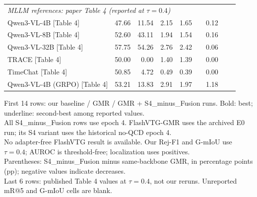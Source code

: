 \documentclass{article}
\begin{document}
\begin{table}[ht]
{\begin{tabular}{lrrrrrrrr}
\midrule
\multicolumn{9}{l}{\textit{MLLM references: paper Table 4 (reported at $\tau=0.4$)}} \\
Qwen3-VL-4B [Table 4] & 47.66 & 11.54 & 2.15 & 1.65 &  & 0.12 &  &  \\
Qwen3-VL-8B [Table 4] & 52.60 & 43.11 & 1.94 & 1.54 &  & 0.16 &  &  \\
Qwen3-VL-32B [Table 4] & 57.75 & 54.26 & 2.76 & 2.42 &  & 0.06 &  &  \\
TRACE [Table 4] & 50.00 & 0.00 & 1.40 & 1.39 &  & 0.00 &  &  \\
TimeChat [Table 4] & 50.85 & 4.72 & 0.49 & 0.39 &  & 0.00 &  &  \\
Qwen3-VL-4B (GRPO) [Table 4] & 53.21 & 13.83 & 2.91 & 1.97 &  & 1.18 &  &  \\
\bottomrule
\end{tabular}}
\par\smallskip\begin{minipage}{\textwidth}\footnotesize
First 14 rows: our baseline / GMR / GMR + S4\_minus\_Fusion runs. Bold: best; underline: second-best among reported values.\\
All S4\_minus\_Fusion rows use epoch 4. FlashVTG-GMR uses the archived E0 run; its S4 variant uses the historical no-QCD epoch 4.\\
No adapter-free FlashVTG result is available. Our Rej-F1 and G-mIoU use $\tau=0.4$; AUROC is threshold-free; localization uses positives.\\
Parentheses: S4\_minus\_Fusion minus same-backbone GMR, in percentage points (pp); negative values indicate decreases.\\
Last 6 rows: published Table 4 values at $\tau=0.4$, not our reruns. Unreported mR@5 and G-mIoU cells are blank.
\end{minipage}
\end{table}
\end{document}
